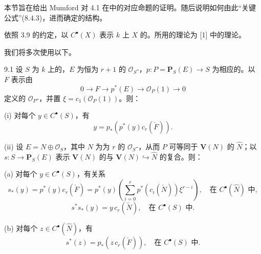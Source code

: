 本节旨在给出 Mumford 对 4.1 在中的对应命题的证明。随后说明如何由此“关键公式”(8.4.3)，进而确定的结构。

依照 3.9 的约定，以 $C^\bullet(X)$ 表示 $k$ 上 $X$ 的。所用的理论为 [1] 中的理论。

我们将多次使用以下。
\begin{SGAresult}{}{9.1}
设 $S$ 为 $k$ 上的，$E$ 为恒为 $r+1$ 的 $\mathscr O_S$-，$p:P=\mathbf P_S(E)\to S$ 为相应的。以 $F$ 表示由
\[
 0\longrightarrow F\longrightarrow p^*(E)\longrightarrow\mathscr O_P(1)\longrightarrow0
 \tag{9.1.0}
\]
定义的 $\mathscr O_P$-，并置 $\xi=c_1(\mathscr O_P(1))$。则：

(i) 对每个 $y\in C^\bullet(S)$，有
\[
 y=p_*(p^*(y)c_r(\check F)).\tag{9.1.1}
\]

(ii) 设 $E=N\oplus\mathscr O_S$，其中 $N$ 为为 $r$ 的 $\mathscr O_S$-，从而 $P$ 可等同于 $\mathbf V(N)$ 的 $\widehat N$；以 $s:S\to\mathbf P_S(E)$ 表示 $\mathbf V(N)$ 的与 $\mathbf V(N)\hookrightarrow\widehat N$ 的复合。则：

(a) 对每个 $y\in C^\bullet(S)$，有关系
\[
 s_*(y)=p^*(y)c_r(\check F)=p^*(y)\left(\sum_{i=0}^r p^*(c_i(\check N))\xi^{r-i}\right),
 \quad\text{在 }C^\bullet(\widehat N)\text{ 中},\tag{9.1.2}
\]
\[
 s^*s_*(y)=y\,c_r(\check N),\quad\text{在 }C^\bullet(S)\text{ 中}.\tag{9.1.3}
\]

(b) 对每个 $z\in C^\bullet(\widehat N)$，有
\[
 s^*(z)=p_*(z\,c_r(\check F)),\quad\text{在 }C^\bullet(S)\text{ 中}.\tag{9.1.4}
\]
\end{SGAresult}
